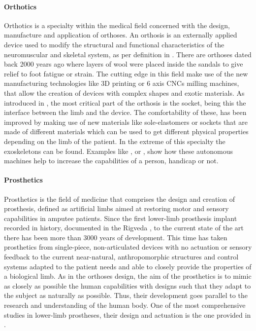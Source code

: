 \paragraph{Orthotics} %
\label{par:orthotics}
Orthotics is a specialty within the medical field concerned with the design, manufacture and application of orthoses. An orthosis is an externally applied device used to modify the structural and functional characteristics of the neuromuscular and skeletal system, as per definition in \cite{ISO_orthosis}. 
There are orthoses dated back 2000 years ago where layers of wool were placed inside the sandals to give relief to foot fatigue or strain.
The cutting edge in this field make use of the new manufacturing technologies like 3D printing or 6 axis CNCs milling machines, that allow the creation of devices with complex shapes and exotic materials.
As introduced in \cite{herbert2005preliminary}, the most critical part of the orthosis is the socket, being this the interface between the limb and the device.
The comfortability of these, has been improved by making use of new materials like sole-elastomers or sockets that are made of different materials which can be used to get different physical properties depending on the limb of the patient.
In the extreme of this specialty the exoskeletons can be found. Examples like \cite{zoss2006biomechanical}, \cite{veneman2007design} or \cite{pratt2004roboknee}, show how these autonomous machines help to increase the capabilities of a person, handicap or not.

\paragraph{Prosthetics} %
\label{par:prosthetics}
Prosthetics is the field of medicine that comprises the design and creation of prosthesis, defined as artificial limbs aimed at restoring motor and sensory capabilities in amputee patients.
Since the first lower-limb prosthesis implant recorded in history, documented in the Rigveda \cite{prosthetics_history}, to the current state of the art there has been more than 3000 years of development.
This time has taken prosthetics from single-piece, non-articulated devices with no actuation or sensory feedback to the current near-natural, anthropomorphic structures and control systems adapted to the patient needs and able to closely provide the properties of a biological limb.
As in the orthoses design, the aim of the prosthetics is to mimic as closely as possible the human capabilities with designs such that they adapt to the subject as naturally as possible.
Thus, their development goes parallel to the research and understanding of the human body.
One of the most comprehensive studies in lower-limb prostheses, their design and actuation is the one provided in \cite{grimmer}.

